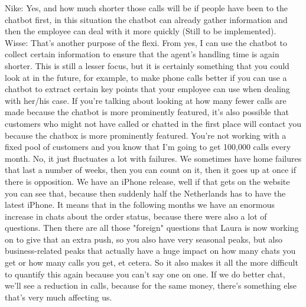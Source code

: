 \begin{appendices}
	\break
	Nike: Yes, and how much shorter those calls will be if people have been to the chatbot first, in this situation the chatbot can already gather information and then the employee can deal with it more quickly (Still to be implemented).\\
	\break
	Wisse: That's another purpose of the flexi. From yes, I can use the chatbot to collect certain information to ensure that the agent's handling time is again shorter. This is still a lesser focus, but it is certainly something that you could look at in the future, for example, to make phone calls better if you can use a chatbot to extract certain key points that your employee can use when dealing with her/his case. If you're talking about looking at how many fewer calls are made because the chatbot is more prominently featured, it's also possible that customers who might not have called or chatted in the first place will contact you because the chatbox is more prominently featured. You're not working with a fixed pool of customers and you know that I'm going to get 100,000 calls every month. No, it just fluctuates a lot with failures. We sometimes have home failures that last a number of weeks, then you can count on it, then it goes up at once if there is opposition. We have an iPhone release, well if that gets on the website you can see that, because then suddenly half the Netherlands has to have the latest iPhone. It means that in the following months we have an enormous increase in chats about the order status, because there were also a lot of questions. Then there are all those "foreign" questions that Laura is now working on to give that an extra push, so you also have very seasonal peaks, but also business-related peaks that actually have a huge impact on how many chats you get or how many calls you get, et cetera. So it also makes it all the more difficult to quantify this again because you can't say one on one. If we do better chat, we'll see a reduction in calls, because for the same money, there's something else that's very much affecting us.
	

\end{appendices}
